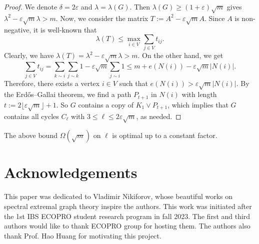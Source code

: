 \documentclass[11pt,a4paper]{article}
\theoremstyle{definition}
\theoremstyle{remark}
\begin{document}
\begin{proof}
    We denote $\delta =2 \varepsilon$ and $\lambda = \lambda (G)$. 
    Then $\lambda (G)\ge (1+\varepsilon)\sqrt{m}$ gives 
    $\lambda^2 - \varepsilon \sqrt{m} 
    \lambda > m$. Now, we consider the matrix $T:=A^2 - \varepsilon \sqrt{m} A$. Since $A$ is non-negative, 
    it is well-known that 
    \[ \lambda (T)\le \max_{i\in V} \sum_{j\in V} t_{ij}.\]  Clearly, we have 
    $\lambda (T) = \lambda^2- \varepsilon \sqrt{m} \lambda > m$. 
    On the other hand, we get  
 \[ \sum_{j\in V}t_{ij} =
    \sum_{k\sim i} \sum_{j\sim k} 1 - \varepsilon \sqrt{m} \sum_{j\sim i} 1 
    \le m +e(N(i)) - \varepsilon \sqrt{m} |N(i)|. \]
    Therefore, there exists a vertex  
    $i\in V$ such that $e(N(i)) > \varepsilon \sqrt{m} |N(i)|$. 
    By the Erd\H{o}s--Gallai theorem, we find a path $P_{t+1}$ in $N(i)$ with length $t := 2 \lfloor \varepsilon \sqrt{m} \rfloor +1$. So $G$ contains a copy of $K_1\vee P_{t+1}$, which implies that $G$ contains all cycles $C_{\ell}$ with $3\le \ell \le 2\varepsilon \sqrt{m}$, as needed.     
\end{proof}

The above bound $\Omega (\sqrt{m})$ on $\ell$ is optimal up to a constant factor.








\section*{Acknowledgements}
This paper was dedicated to Vladimir Nikiforov, whose beautiful works on spectral extremal graph theory inspire the authors. 
This work was initiated after the 1st IBS ECOPRO student research program in fall 2023. The first and third authors would like to thank ECOPRO group for hosting them. The authors also thank Prof. Hao Huang for motivating this project. 




\frenchspacing
\end{document}

